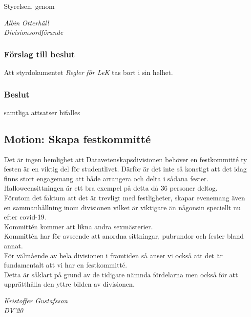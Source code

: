 \documentclass[protokoll]{dvd}
\begin{document}
Styrelsen, genom

\emph{Albin Otterhäll\\Divisionsordförande}

\subsubsection*{Förslag till beslut}

\begin{attsatser}
    \item Att styrdokumentet \emph{Regler för LeK} tas bort i sin helhet.
\end{attsatser}

\subsubsection*{Beslut}
    \begin{attsatser}
        \item samtliga attsatser bifalles
    \end{attsatser}



\subsection{Motion: Skapa festkommitté}

    Det är ingen hemlighet att Datavetenskapsdivisionen behöver en festkommitté ty festen är en viktig del för studentlivet.
    Därför är det inte så konstigt att det idag finns stort engagemang att både arrangera och delta i sådana fester. \\
    Halloweensittningen är ett bra exempel på detta då 36 personer deltog. \\
    Förutom det faktum att det är trevligt med festligheter, skapar evenemang även en sammanhållning inom divisionen vilket är viktigare än någonsin speciellt nu efter covid-19. \\
    Kommittén kommer att likna andra sexmästerier. \\
    Kommittén har för avseende att anordna sittningar, pubrundor och fester bland annat. \\
    För välmående av hela divisionen i framtiden så anser vi också att det är fundamentalt att vi har en festkommitté. \\
    Detta är såklart på grund av de tidigare nämnda fördelarna men också för att upprätthålla den yttre bilden av divisionen.

    \emph{Kristoffer Gustafsson\\DV'20}
\end{document}
